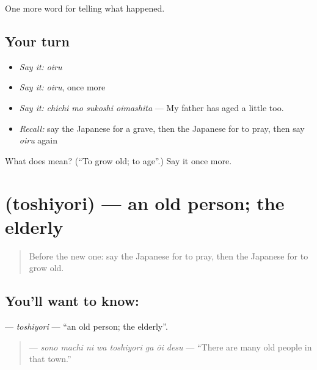 \begin{grammarlens}[title={What you've built}]
One more word for telling what happened.
\end{grammarlens}

\subsection*{Your turn}
\begin{itemize}
\raggedright
  \item \emph{Say it:} \emph{oiru}
  \item \emph{Say it:} \emph{oiru}, once more
  \item \emph{Say it:} \emph{chichi mo sukoshi oimashita} — My father has aged a little too.
  \item \emph{Recall:} say the Japanese for a grave, then the Japanese for to pray, then say \emph{oiru} again
\end{itemize}

\begin{tcolorbox}[breakable,colback=teal!4,colframe=teal!35!black,title={Before you move on}]
What does  mean? (\textquotedblleft{}To grow old; to age\textquotedblright{}.) Say it once more.
\end{tcolorbox}
\section[\texorpdfstring{\ja{としより} (toshiyori)}{としより (toshiyori)}]{ (toshiyori) — an old person; the elderly}

\label{lesson:JA-C292-toshiyori}



\begin{quote}
Before the new one: say the Japanese for to pray, then the Japanese for to grow old.
\end{quote}

\subsection*{You'll want to know: }
\textbf{} — \emph{toshiyori} — \textquotedblleft{}an old person; the elderly\textquotedblright{}.

\begin{quote}
\textbf{   } — \emph{sono machi ni wa toshiyori ga ōi desu} — \textquotedblleft{}There are many old people in that town.\textquotedblright{}
\end{quote}

